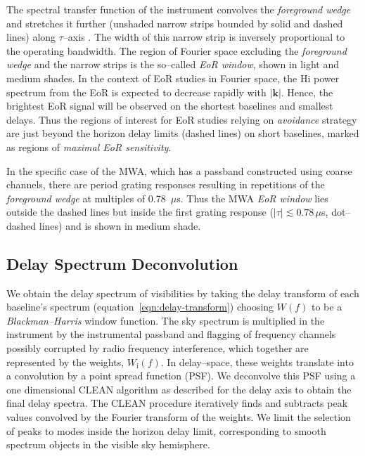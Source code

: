 \documentclass[preprint2,iop,numberedappendix,twocolappendix,appendixfloats]{emulateapj}
\begin{document}
The spectral transfer function of the instrument convolves the {\it foreground wedge} and stretches it further (unshaded narrow strips bounded by solid and dashed lines) along $\tau$--axis \citep{par12b,thy13}. The width of this narrow strip is inversely proportional to the operating bandwidth. The region of Fourier space excluding the {\it foreground wedge} and the narrow strips is the so--called {\it EoR window}, shown in light and medium shades. In the context of EoR studies in Fourier space, the H{\sc i} power spectrum from the EoR is expected to decrease rapidly with $|\boldsymbol{k}|$. Hence, the brightest EoR signal will be observed on the shortest baselines and smallest delays. Thus the regions of interest for EoR studies relying on {\it avoidance} strategy are just beyond the horizon delay limits (dashed lines) on short baselines, marked as regions of {\it maximal EoR sensitivity}. 

In the specific case of the MWA, which has a passband constructed using coarse channels, there are period grating responses resulting in repetitions of the {\it foreground wedge} at multiples of 0.78~$\mu$s. Thus the MWA {\it EoR window} lies outside the dashed lines but inside the first grating response ($|\tau| \lesssim 0.78\,\mu$s, dot--dashed lines) and is shown in medium shade.

\subsection{Delay Spectrum Deconvolution}\label{sec:data-delay-spectrum}

We obtain the delay spectrum of visibilities by taking the delay transform of each baseline's spectrum (equation~\ref{eqn:delay-transform}) choosing $W(f)$ to be a {\it Blackman--Harris} window function. The sky spectrum is multiplied in the instrument by the instrumental passband and flagging of frequency channels possibly corrupted by radio frequency interference, which together are represented by the weights, $W_\textrm{i}(f)$. In delay--space, these weights translate into a convolution by a point spread function (PSF). We deconvolve this PSF using a one dimensional CLEAN algorithm \citep{tay99} as described for the delay axis \citep{par09,par12b} to obtain the final delay spectra. The CLEAN procedure iteratively finds and subtracts peak values convolved by the Fourier transform of the weights. We limit the selection of peaks to modes inside the horizon delay limit, corresponding to smooth spectrum objects in the visible sky hemisphere. 
\end{document}
